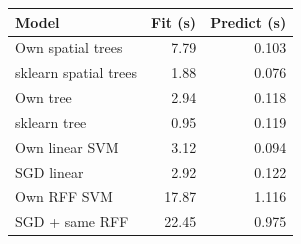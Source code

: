\begin{tabular}{@{}lrr@{}}
\toprule
Model & Fit (s) & Predict (s) \\
\midrule
Own spatial trees & 7.79 & 0.103 \\
sklearn spatial trees & 1.88 & 0.076 \\
Own tree & 2.94 & 0.118 \\
sklearn tree & 0.95 & 0.119 \\
Own linear SVM & 3.12 & 0.094 \\
SGD linear & 2.92 & 0.122 \\
Own RFF SVM & 17.87 & 1.116 \\
SGD + same RFF & 22.45 & 0.975 \\
\bottomrule
\end{tabular}
